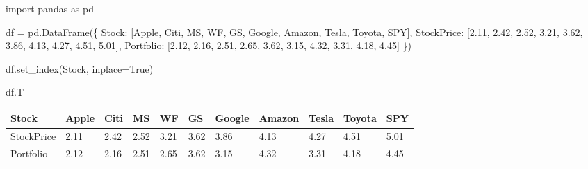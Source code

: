\documentclass[
  letterpaper,
  DIV=11,
  numbers=noendperiod]{scrartcl}
\newenvironment{Shaded}{\begin{snugshade}}{\end{snugshade}}
\newcommand{\FloatTok}[1]{\textcolor[rgb]{0.68,0.00,0.00}{#1}}
\newcommand{\ImportTok}[1]{\textcolor[rgb]{0.00,0.46,0.62}{#1}}
\newcommand{\NormalTok}[1]{\textcolor[rgb]{0.00,0.23,0.31}{#1}}
\newcommand{\OperatorTok}[1]{\textcolor[rgb]{0.37,0.37,0.37}{#1}}
\newcommand{\StringTok}[1]{\textcolor[rgb]{0.13,0.47,0.30}{#1}}
\newcommand{\VariableTok}[1]{\textcolor[rgb]{0.07,0.07,0.07}{#1}}
\begin{document}
\begin{Shaded}
\begin{Highlighting}[]
\ImportTok{import}\NormalTok{ pandas }\ImportTok{as}\NormalTok{ pd}

\NormalTok{df }\OperatorTok{=}\NormalTok{ pd.DataFrame(\{}
    \StringTok{\textquotesingle{}Stock\textquotesingle{}}\NormalTok{: [}\StringTok{\textquotesingle{}Apple\textquotesingle{}}\NormalTok{, }\StringTok{\textquotesingle{}Citi\textquotesingle{}}\NormalTok{, }\StringTok{\textquotesingle{}MS\textquotesingle{}}\NormalTok{, }\StringTok{\textquotesingle{}WF\textquotesingle{}}\NormalTok{, }\StringTok{\textquotesingle{}GS\textquotesingle{}}\NormalTok{, }\StringTok{\textquotesingle{}Google\textquotesingle{}}\NormalTok{, }\StringTok{\textquotesingle{}Amazon\textquotesingle{}}\NormalTok{, }\StringTok{\textquotesingle{}Tesla\textquotesingle{}}\NormalTok{, }\StringTok{\textquotesingle{}Toyota\textquotesingle{}}\NormalTok{, }\StringTok{\textquotesingle{}SPY\textquotesingle{}}\NormalTok{],}
    \StringTok{\textquotesingle{}StockPrice\textquotesingle{}}\NormalTok{: [}\FloatTok{2.11}\NormalTok{, }\FloatTok{2.42}\NormalTok{, }\FloatTok{2.52}\NormalTok{, }\FloatTok{3.21}\NormalTok{, }\FloatTok{3.62}\NormalTok{, }\FloatTok{3.86}\NormalTok{, }\FloatTok{4.13}\NormalTok{, }\FloatTok{4.27}\NormalTok{, }\FloatTok{4.51}\NormalTok{, }\FloatTok{5.01}\NormalTok{], }
    \StringTok{\textquotesingle{}Portfolio\textquotesingle{}}\NormalTok{: [}\FloatTok{2.12}\NormalTok{, }\FloatTok{2.16}\NormalTok{, }\FloatTok{2.51}\NormalTok{, }\FloatTok{2.65}\NormalTok{, }\FloatTok{3.62}\NormalTok{, }\FloatTok{3.15}\NormalTok{, }\FloatTok{4.32}\NormalTok{, }\FloatTok{3.31}\NormalTok{, }\FloatTok{4.18}\NormalTok{, }\FloatTok{4.45}\NormalTok{]}
\NormalTok{\})}

\NormalTok{df.set\_index(}\StringTok{\textquotesingle{}Stock\textquotesingle{}}\NormalTok{, inplace}\OperatorTok{=}\VariableTok{True}\NormalTok{)}

\NormalTok{df.T}
\end{Highlighting}
\end{Shaded}

\begin{longtable}[]{@{}lllllllllll@{}}
\toprule\noalign{}
Stock & Apple & Citi & MS & WF & GS & Google & Amazon & Tesla & Toyota &
SPY \\
\midrule\noalign{}
\endhead
\bottomrule\noalign{}
\endlastfoot
StockPrice & 2.11 & 2.42 & 2.52 & 3.21 & 3.62 & 3.86 & 4.13 & 4.27 &
4.51 & 5.01 \\
Portfolio & 2.12 & 2.16 & 2.51 & 2.65 & 3.62 & 3.15 & 4.32 & 3.31 & 4.18
& 4.45 \\
\end{longtable}
\end{document}
